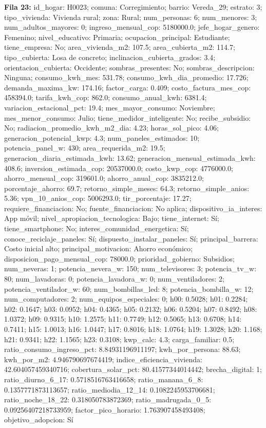 {\footnotesize\textbf{Fila 23:} id\_hogar: H0023; comuna: Corregimiento; barrio: Vereda\_29; estrato: 3; tipo\_vivienda: Vivienda rural; zona: Rural; num\_personas: 6; num\_menores: 3; num\_adultos\_mayores: 0; ingreso\_mensual\_cop: 5180000.0; jefe\_hogar\_genero: Femenino; nivel\_educativo: Primaria; ocupacion\_principal: Estudiante; tiene\_empresa: No; area\_vivienda\_m2: 107.5; area\_cubierta\_m2: 114.7; tipo\_cubierta: Losa de concreto; inclinacion\_cubierta\_grados: 3.4; orientacion\_cubierta: Occidente; sombras\_presentes: No; sombras\_descripcion: Ninguna; consumo\_kwh\_mes: 531.78; consumo\_kwh\_dia\_promedio: 17.726; demanda\_maxima\_kw: 174.16; factor\_carga: 0.409; costo\_factura\_mes\_cop: 458394.0; tarifa\_kwh\_cop: 862.0; consumo\_anual\_kwh: 6381.4; variacion\_estacional\_pct: 19.4; mes\_mayor\_consumo: Noviembre; mes\_menor\_consumo: Julio; tiene\_medidor\_inteligente: No; recibe\_subsidio: No; radiacion\_promedio\_kwh\_m2\_dia: 4.23; horas\_sol\_pico: 4.06; generacion\_potencial\_kwp: 4.3; num\_paneles\_estimados: 10; potencia\_panel\_w: 430; area\_requerida\_m2: 19.5; generacion\_diaria\_estimada\_kwh: 13.62; generacion\_mensual\_estimada\_kwh: 408.6; inversion\_estimada\_cop: 20537000.0; costo\_kwp\_cop: 4776000.0; ahorro\_mensual\_cop: 319601.0; ahorro\_anual\_cop: 3835212.0; porcentaje\_ahorro: 69.7; retorno\_simple\_meses: 64.3; retorno\_simple\_anios: 5.36; vpn\_10\_anios\_cop: 5006293.0; tir\_porcentaje: 17.27; requiere\_financiacion: No; fuente\_financiacion: No aplica; dispositivo\_ia\_interes: App móvil; nivel\_apropiacion\_tecnologica: Bajo; tiene\_internet: Sí; tiene\_smartphone: No; interes\_comunidad\_energetica: Sí; conoce\_reciclaje\_paneles: Sí; dispuesto\_instalar\_paneles: Sí; principal\_barrera: Costo inicial alto; principal\_motivacion: Ahorro económico; disposicion\_pago\_mensual\_cop: 78000.0; prioridad\_gobierno: Subsidios; num\_neveras: 1; potencia\_nevera\_w: 150; num\_televisores: 3; potencia\_tv\_w: 80; num\_lavadoras: 0; potencia\_lavadora\_w: 0; num\_ventiladores: 2; potencia\_ventilador\_w: 60; num\_bombillas\_led: 8; potencia\_bombilla\_w: 12; num\_computadores: 2; num\_equipos\_especiales: 0; h00: 0.5028; h01: 0.2284; h02: 0.1647; h03: 0.0952; h04: 0.4365; h05: 0.2132; h06: 0.5204; h07: 0.8492; h08: 1.0372; h09: 0.9315; h10: 1.2575; h11: 0.7749; h12: 0.5065; h13: 0.6708; h14: 0.7411; h15: 1.0013; h16: 1.0447; h17: 0.8016; h18: 1.0764; h19: 1.3028; h20: 1.168; h21: 0.9341; h22: 1.1565; h23: 0.3108; kwp\_calc: 4.3; carga\_familiar: 0.5; ratio\_consumo\_ingreso\_pct: 8.84931196911197; kwh\_por\_persona: 88.63; kwh\_por\_m2: 4.946790697674419; indice\_eficiencia\_vivienda: 42.604057459340716; cobertura\_solar\_pct: 80.41577344014442; brecha\_digital: 1; ratio\_diurno\_6\_17: 0.5718516763416658; ratio\_manana\_6\_8: 0.1357771873113657; ratio\_mediodia\_12\_14: 0.1082245953706681; ratio\_noche\_18\_22: 0.318050783872369; ratio\_madrugada\_0\_5: 0.09256407218733959; factor\_pico\_horario: 1.763907458493408; objetivo\_adopcion: Sí\par}
